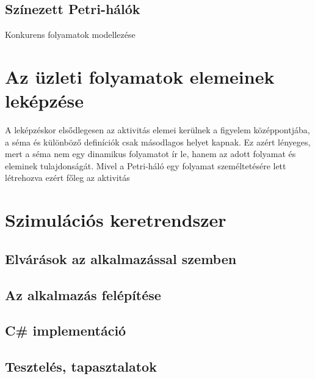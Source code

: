 \documentclass[12pt,a4paper]{book}
\begin{document}
\section{Színezett Petri-hálók}

Konkurens folyamatok modellezése

\chapter{Az üzleti folyamatok elemeinek leképzése}

A leképzéskor elsődlegesen az aktivitás elemei kerülnek a figyelem középpontjába, a séma és különböző definíciók csak másodlagos helyet kapnak. Ez azért lényeges, mert a séma nem egy dinamikus folyamatot ír le, hanem az adott folyamat és eleminek tulajdonságát. Mivel a Petri-háló egy folyamat személtetésére lett létrehozva ezért főleg az aktivitás


\chapter{Szimulációs keretrendszer}


\section{Elvárások az alkalmazással szemben}


\section{Az alkalmazás felépítése}


\section{C\# implementáció}


\section{Tesztelés, tapasztalatok}
\end{document}
